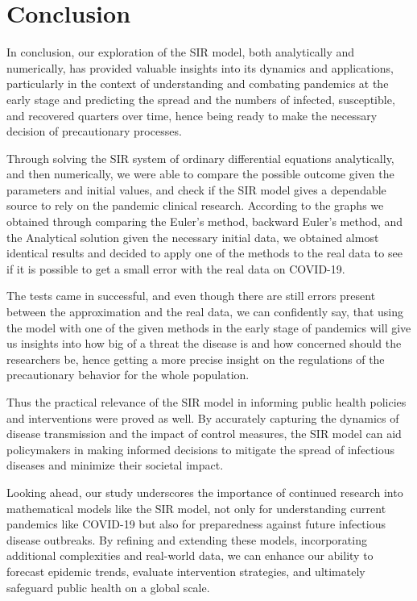 \section{Conclusion}\label{Conclusion}\thispagestyle{SectionFirstPage} %
\hspace{\parindent} In conclusion, our exploration of the SIR model, both
analytically and numerically, has provided valuable insights
into its dynamics and applications, particularly in the context
of understanding and combating pandemics at the early stage and predicting the spread
 and the numbers of infected, susceptible, and recovered quarters over time, hence
being ready to make the necessary decision of precautionary processes.
\par Through solving the SIR system of ordinary differential equations analytically, and
then numerically, we were able to compare the possible outcome given the parameters and initial values,
 and check if the SIR model gives a dependable source to rely on the pandemic clinical research.
According to the graphs we obtained through comparing the Euler's method, backward Euler's method, and the Analytical solution
given the necessary initial data, we obtained almost identical results and decided to apply one of the methods to the real data
to see if it is possible to get a small error with the real data on COVID-19.
\par The tests came in successful, and even though there are still errors present between the
approximation and the real data, we can confidently say, that using the model with
one of the given methods in the early stage of pandemics will give us insights into how big of a threat
the disease is and how concerned should the researchers be, hence getting a more precise insight on
the regulations of the precautionary behavior for the whole population.
\par Thus the practical relevance of the SIR model in informing public health policies
and interventions were proved as well. By accurately capturing the dynamics of disease transmission
and the impact of control measures, the SIR model can aid policymakers in making
informed decisions to mitigate the spread of infectious diseases and minimize their societal impact.
\par Looking ahead, our study underscores the importance of continued research into mathematical
models like the SIR model, not only for understanding current pandemics like COVID-19 but also
for preparedness against future infectious disease outbreaks. By refining and extending these
models, incorporating additional complexities and real-world data, we can enhance our ability
to forecast epidemic trends, evaluate intervention strategies, and ultimately safeguard public
health on a global scale.